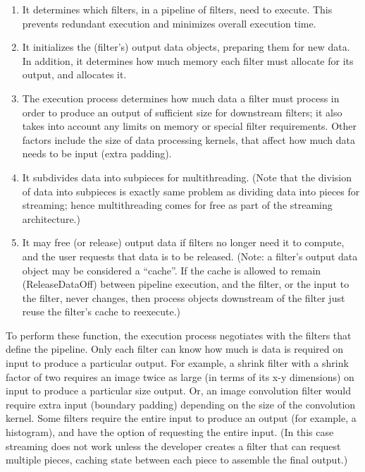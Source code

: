 \begin{enumerate}
        \item It determines which filters, in a pipeline of filters, need to
        execute. This prevents redundant execution and minimizes overall
        execution time.

        \item It initializes the (filter's) output data objects, preparing
        them for new data.  In addition, it determines how much memory each
        filter must allocate for its output, and allocates it.

        \item The execution process determines how much data a filter must
        process in order to produce an output of sufficient size for
        downstream filters; it also takes into account any limits on memory
        or special filter requirements. Other factors include the size of
        data processing kernels, that affect how much data needs to be input
        (extra padding).

        \item It subdivides data into subpieces for multithreading. (Note
        that the division of data into subpieces is exactly same problem as
        dividing data into pieces for streaming; hence multithreading comes
        for free as part of the streaming architecture.)

        \item It may free (or release) output data if filters no longer need
        it to compute, and the user requests that data is to be
        released. (Note: a filter's output data object may be considered a
        ``cache''. If the cache is allowed to remain (ReleaseDataOff) between
        pipeline execution, and the filter, or the input to the filter, never
        changes, then process objects downstream of the filter just reuse the
        filter's cache to reexecute.)
\end{enumerate}

To perform these function, the execution process negotiates with the
filters that define the pipeline. Only each filter can know how much is data is
required on input to produce a particular output. For example, a shrink
filter with a shrink factor of two requires an image twice as large (in terms
of its x-y dimensions) on input to produce a particular size output. Or, an
image convolution filter would require extra input (boundary padding)
depending on the size of the convolution kernel. Some filters require the
entire input to produce an output (for example, a histogram), and have the
option of requesting the entire input. (In this case streaming does not work
unless the developer creates a filter that can request multiple pieces,
caching state between each piece to assemble the final output.)


